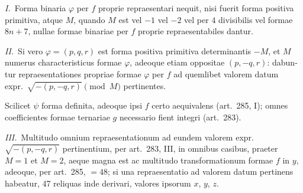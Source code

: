 \documentclass[12pt,a4paper]{article}
\theoremstyle{plain}
\theoremstyle{definition}
\theoremstyle{remark}
\begin{document}
\begin{otherlanguage}{latin}
\textit{I.}\ Forma binaria $\varphi$ per $f$ proprie repraesentari nequit, nisi fuerit forma positiva primitiva, atque $M$, quando $M$ est vel $-1$ vel $-2$ vel per $4$ divisibilis vel formae $8n+7$, nullae formae binariae per $f$ proprie repraesentabiles dantur.

\textit{II.}\ Si vero $\varphi = (p, q, r)$ est forma positiva primitiva determinantis $-M$, et $M$ numerus characteristicus formae $\varphi$, adeoque etiam oppositae $(p, -q, r)$: dabuntur repraesentationes propriae formae $\varphi$ per $f$ ad quemlibet valorem datum expr.\ $\sqrt{-(p, -q, r)} \pmod{M}$ pertinentes.

Scilicet $\psi$ forma definita, adeoque ipsi $f$ certo aequivalens (art.\ 285, I); omnes coefficientes formae ternariae $g$ necessario fient integri (art.\ 283).

\textit{III.}\ Multitudo omnium repraesentationum ad eundem valorem expr.\ $\sqrt{-(p, -q, r)}$ pertinentium, per art.\ 283, III, in omnibus casibus, praeter $M = 1$ et $M = 2$, aeque magna est ac multitudo transformationum formae $f$ in $y$, adeoque, per art.\ 285, $= 48$; si una repraesentatio ad valorem datum pertinens habeatur, 47 reliquas inde derivari, valores ipsorum $x$, $y$, $z$.

\end{otherlanguage}
\end{document}
